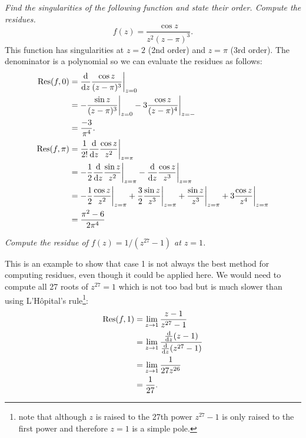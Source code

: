 \documentclass{article}
\begin{document}
    \begin{example}
        \emph{Find the singularities of the following function and state their order. Compute the residues.}
        \[f(z) = \frac{\cos z}{z^2 (z - \pi)^3}.\]
        This function has singularities at \(z = 2\) (2nd order) and \(z = \pi\) (3rd order).
        The denominator is a polynomial so we can evaluate the residues as follows:
        \begin{align*}
            \Res(f, 0) &= \dv{z} \frac{\cos z}{(z - \pi)^3}\bigg|_{z=0}\\
            &= -\frac{\sin z}{(z - \pi)^3}\bigg|_{z=0} - 3\frac{\cos z}{(z - \pi)^4}\bigg|_{z=-}\\
            &= \frac{-3}{\pi^4}.\\
            \Res(f, \pi) &= \frac{1}{2!}\dv{z}\frac{\cos z}{z^2}\bigg|_{z=\pi}\\
            &= -\frac{1}{2}\dv{z}\frac{\sin z}{z^2}\bigg|_{z=\pi} - \dv{z}\frac{\cos z}{z^3}\bigg|_{z=\pi}\\
            &= -\frac{1}{2}\frac{\cos z}{z^2}\bigg|_{z=\pi} + \frac{3}{2}\frac{\sin z}{z^3}\bigg|_{z=\pi} + \frac{\sin z}{z^3}\bigg|_{z=\pi} + 3\frac{\cos z}{z^4}\bigg|_{z=\pi}\\
            &= \frac{\pi^2 - 6}{2\pi^4}
        \end{align*}
    \end{example}
    \begin{example}
        \emph{Compute the residue of \(f(z) = 1/(z^{27} - 1)\) at \(z = 1\).}
        
        This is an example to show that case 1 is not always the best method for computing residues, even though it could be applied here.
        We would need to compute all 27 roots of \(z^27 = 1\) which is not too bad but is much slower than using L'H\^{o}pital's rule\footnote{note that although \(z\) is raised to the 27th power \(z^{27} - 1\) is only raised to the first power and therefore \(z = 1\) is a simple pole.}:
        \begin{align*}
            \Res(f, 1) &= \lim_{z\to 1} \frac{z - 1}{z^{27} - 1}\\
            &= \lim_{z\to 1} \frac{\dv{z}(z - 1)}{\dv{z}(z^{27} - 1)}\\
            &= \lim_{z\to 1} \frac{1}{27z^{26}}\\
            &= \frac{1}{27}.
        \end{align*}
    \end{example}
    
\end{document}
